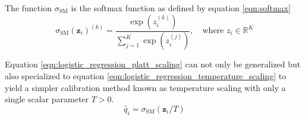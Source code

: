 The function $\sigma_{\mathrm{SM}}$ is the softmax function as defined by equation \ref{eqn:softmax}
\begin{equation}
\label{eqn:softmax}
\sigma_{\mathrm{SM}}\left(\mathbf{z}_{i}\right)^{(k)}=\frac{\exp \left(z_{i}^{(k)}\right)}{\sum_{j=1}^{K} \exp \left(z_{i}^{(j)}\right)}, \quad \text{where } z_{i} \in \mathbb{R}^{K}
\end{equation}

Equation \ref{eqn:logistic_regression_platt_scaling} can not only be generalized but also specialized to equation \ref{eqn:logistic_regression_temperature_scaling} to yield a simpler calibration method known as temperature scaling with only a single scalar parameter $T>0$.
\begin{equation}
\label{eqn:logistic_regression_temperature_scaling}
\hat{q}_{i}=\sigma_{\mathrm{SM}}\left(\mathbf{z}_{i} / T\right)
\end{equation}

